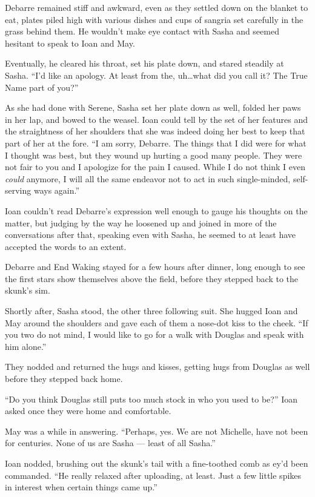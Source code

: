 Debarre remained stiff and awkward, even as they settled down on the blanket to eat, plates piled high with various dishes and cups of sangria set carefully in the grass behind them. He wouldn't make eye contact with Sasha and seemed hesitant to speak to Ioan and May.

Eventually, he cleared his throat, set his plate down, and stared steadily at Sasha. ``I'd like an apology. At least from the, uh\ldots what did you call it? The True Name part of you?''

As she had done with Serene, Sasha set her plate down as well, folded her paws in her lap, and bowed to the weasel. Ioan could tell by the set of her features and the straightness of her shoulders that she was indeed doing her best to keep that part of her at the fore. ``I am sorry, Debarre. The things that I did were for what I thought was best, but they wound up hurting a good many people. They were not fair to you and I apologize for the pain I caused. While I do not think I even \emph{could} anymore, I will all the same endeavor not to act in such single-minded, self-serving ways again.''

Ioan couldn't read Debarre's expression well enough to gauge his thoughts on the matter, but judging by the way he loosened up and joined in more of the conversations after that, speaking even with Sasha, he seemed to at least have accepted the words to an extent.

Debarre and End Waking stayed for a few hours after dinner, long enough to see the first stars show themselves above the field, before they stepped back to the skunk's sim.

Shortly after, Sasha stood, the other three following suit. She hugged Ioan and May around the shoulders and gave each of them a nose-dot kiss to the cheek. ``If you two do not mind, I would like to go for a walk with Douglas and speak with him alone.''

They nodded and returned the hugs and kisses, getting hugs from Douglas as well before they stepped back home.

``Do you think Douglas still puts too much stock in who you used to be?'' Ioan asked once they were home and comfortable.

May was a while in answering. ``Perhaps, yes. We are not Michelle, have not been for centuries. None of us are Sasha — least of all Sasha.''

Ioan nodded, brushing out the skunk's tail with a fine-toothed comb as ey'd been commanded. ``He really relaxed after uploading, at least. Just a few little spikes in interest when certain things came up.''

